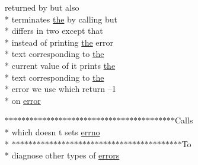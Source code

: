 \begin{DoxyCompactItemize}
returned by but also \\*
terminates \hyperlink{ClientServer_2server_2Makefile_a09c6b60bb7451f9136e25140ffdff6bd}{the} by calling but \\*
differs in two except that \\*
instead of printing \hyperlink{ClientServer_2server_2Makefile_a09c6b60bb7451f9136e25140ffdff6bd}{the} error \\*
text corresponding to \hyperlink{ClientServer_2server_2Makefile_a09c6b60bb7451f9136e25140ffdff6bd}{the} \\*
current value of it prints \hyperlink{ClientServer_2server_2Makefile_a09c6b60bb7451f9136e25140ffdff6bd}{the} \\*
text corresponding to \hyperlink{ClientServer_2server_2Makefile_a09c6b60bb7451f9136e25140ffdff6bd}{the} \\*
error we use which return –1 \\*
on \hyperlink{common_2README_a80171b13188418b4328f9247d3aff3d2}{error}
\item 
$\ast$$\ast$$\ast$$\ast$$\ast$$\ast$$\ast$$\ast$$\ast$$\ast$$\ast$$\ast$$\ast$$\ast$$\ast$$\ast$$\ast$$\ast$$\ast$$\ast$$\ast$$\ast$$\ast$$\ast$$\ast$$\ast$$\ast$$\ast$$\ast$$\ast$$\ast$$\ast$$\ast$$\ast$$\ast$$\ast$$\ast$$\ast$$\ast$$\ast$$\ast$Calls \\*
which doesn t sets \hyperlink{common_2README_afe75ee0c7e5a90ba6bb38426ea69b996}{errno} \\*
$\ast$$\ast$$\ast$$\ast$$\ast$$\ast$$\ast$$\ast$$\ast$$\ast$$\ast$$\ast$$\ast$$\ast$$\ast$$\ast$$\ast$$\ast$$\ast$$\ast$$\ast$$\ast$$\ast$$\ast$$\ast$$\ast$$\ast$$\ast$$\ast$$\ast$$\ast$$\ast$$\ast$$\ast$$\ast$$\ast$$\ast$$\ast$$\ast$$\ast$$\ast$To \\*
diagnose other types of \hyperlink{common_2README_a9912daeb8cc621a6ee8e1d24ebdbe601}{errors}
\end{DoxyCompactItemize}


